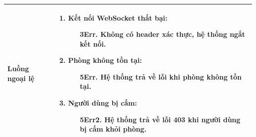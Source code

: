 {\begin{tabularx}{\textwidth}{|>{\raggedright\arraybackslash}X|>{\raggedright\arraybackslash}X|}
\hline
\textbf{Luồng ngoại lệ} &
\begin{enumerate}
    \item \textbf{Kết nối WebSocket thất bại:}
    \begin{enumerate}
        \item[3Err.] Không có header xác thực, hệ thống ngắt kết nối.
    \end{enumerate}
    \item \textbf{Phòng không tồn tại:}
    \begin{enumerate}
        \item[5Err.] Hệ thống trả về lỗi khi phòng không tồn tại.
    \end{enumerate}
    \item \textbf{Người dùng bị cấm:}
    \begin{enumerate}
        \item[5Err2.] Hệ thống trả về lỗi 403 khi người dùng bị cấm khỏi phòng.
    \end{enumerate}
\end{enumerate} \\
\hline
\end{tabularx}
}
